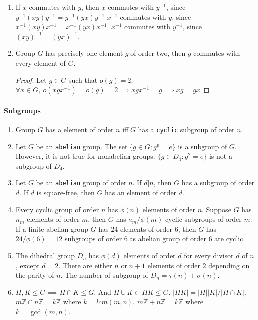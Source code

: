 \begin{enumerate}
	\item If $x$ commutes with $y$, then
		\subitem $x$ commutes with $y^{-1}$, since $y^{-1}(xy)y^{-1} = y^{-1}(yx)y^{-1}$
		\subitem $x^{-1}$ commutes with $y$, since $x^{-1}(xy)x^{-1} = x^{-1}(yx)x^{-1}$.
		\subitem $x^{-1}$ commutes with $y^{-1}$, since $(xy)^{-1} = (yx)^{-1}$.
	\item Group $G$ has precisely one element $g$ of order two, then $g$ commutes with every element of $G$.
	\begin{proof}
		Let $g \in G$ such that $o(g) = 2$.\\
		$\forall x \in G,\ o(xgx^{-1}) = o(g) = 2 \implies xgx^{-1} = g \implies xg = gx$
	\end{proof}
\end{enumerate}

\paragraph{Subgroups}
\begin{enumerate}
	\item Group $G$ has a element of order $n$ iff $G$ has a \texttt{cyclic} subgroup of order $n$. 
	\item Let $G$ be an \texttt{abelian} group. The set $\{ g \in G : g^p = e \}$ is a subgroup of $G$.
	However, it is not true for nonabelian groups.
	$\{ g \in D_4 : g^2 = e \}$ is not a subgroup of $D_4$.
	\item Let $G$ be an \texttt{abelian} group of order $n$. If $d|n$, then $G$ has a subgroup of order $d$. If $d$ is square-free, then $G$ has an element of order $d$.
	\item Every cyclic group of order $n$ has $\phi(n)$ elements of order $n$.
		Suppose $G$ has $n_m$ elements of order $m$, then $G$ has $n_m/\phi(m)$ cyclic subgroups of order $m$.
		\subitem If a finite abelian group $G$ has $24$ elements of order $6$, then $G$ has $24/\phi(6) = 12$ subgroups of order $6$ as abelian group of order $6$ are cyclic.
	\item The dihedral group $D_n$ has $\phi(d)$ elements of order $d$ for every divisor $d$ of $n$, except $d=2$. There are either $n$ or $n+1$ elements of order $2$ depending on the parity of $n$.
	The number of subgroup of $D_n = \tau(n)+\sigma(n)$.
	\item $H,K \le G \implies H \cap K \le G$. And $H \cup K \subset HK \le G$.
		\subitem $|HK| = |H| |K| / |H \cap K|$.
		\subitem $m\mathbb{Z} \cap n\mathbb{Z} = k\mathbb{Z}$ where $k = lcm(m,n)$.
		\subitem $m\mathbb{Z} + n\mathbb{Z} = k\mathbb{Z}$ where $k = \gcd(m,n)$.
\end{enumerate}

